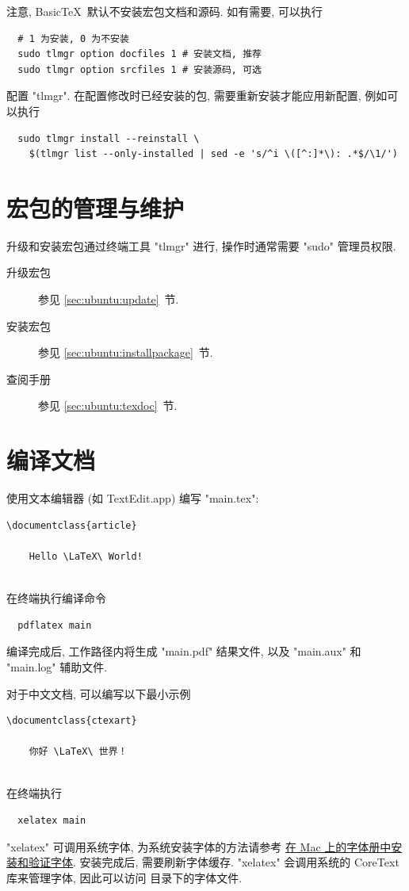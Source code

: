 注意, Basic\TeX\ 默认不安装宏包文档和源码. 如有需要, 可以执行
\begin{lstlisting}
  # 1 为安装, 0 为不安装
  sudo tlmgr option docfiles 1 # 安装文档, 推荐
  sudo tlmgr option srcfiles 1 # 安装源码, 可选
\end{lstlisting}
配置 "tlmgr". 在配置修改时已经安装的包, 需要重新安装才能应用新配置, 例如可以执行
\begin{lstlisting}
  sudo tlmgr install --reinstall \
    $(tlmgr list --only-installed | sed -e 's/^i \([^:]*\): .*$/\1/')
\end{lstlisting}

\section{宏包的管理与维护}

升级和安装宏包通过终端工具 "tlmgr" 进行,
操作时通常需要 "sudo" 管理员权限.

\begin{description}
  \item[升级宏包] 参见 \ref{sec:ubuntu:update}~节.
  \item[安装宏包] 参见 \ref{sec:ubuntu:installpackage}~节.
  \item[查阅手册] 参见 \ref{sec:ubuntu:texdoc}~节.
\end{description}

\section{编译文档}

使用文本编辑器 (如 TextEdit.app) 编写 "main.tex":
\begin{lstlisting}[language = mwe]
  \documentclass{article}
  
    Hello \LaTeX\ World!
  
\end{lstlisting}
在\textsf{终端}执行编译命令
\begin{lstlisting}
  pdflatex main
\end{lstlisting}
编译完成后, 工作路径内将生成 "main.pdf" 结果文件,
以及 "main.aux" 和 "main.log" 辅助文件.

对于中文文档, 可以编写以下最小示例%
\begin{lstlisting}[language = mwe]
  \documentclass{ctexart}
  
    你好 \LaTeX\ 世界！
  
\end{lstlisting}
在\textsf{终端}执行
\begin{lstlisting}
  xelatex main
\end{lstlisting}
"xelatex" 可调用系统字体,
为系统安装字体的方法请参考%
\href{https://support.apple.com/zh-cn/guide/font-book/fntbk1000/mac}{在 Mac 上的字体册中安装和验证字体}.
安装完成后, 需要刷新字体缓存.
"xelatex" 会调用系统的 CoreText 库来管理字体,
因此可以访问  目录下的字体文件.

